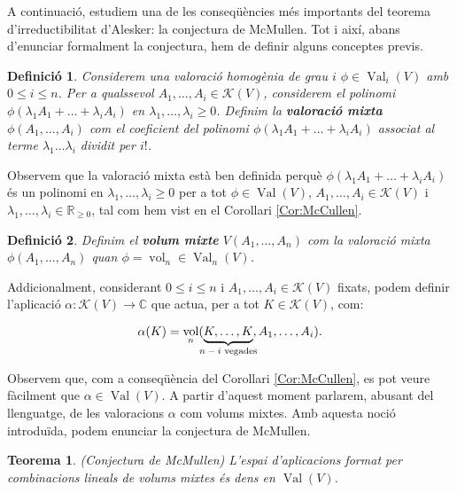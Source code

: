 \documentclass{article}
\newtheorem{teorema}{Teorema}
\newtheorem{definicio}{Definici\'{o}}
\theoremstyle{definition}
\DeclareMathOperator{\Val}{Val}
\DeclareMathOperator{\vol}{vol}
\begin{document}
A continuaci\'{o}, estudiem una de les conseq\"{u}\`{e}ncies m\'{e}s importants del teorema d'irreductibilitat d'Alesker: la conjectura de McMullen. Tot i aix\'{i}, abans d'enunciar formalment la conjectura, hem de definir alguns conceptes previs. 

\begin{definicio} \label{def:mixed}
Considerem una valoraci\'{o} homog\`{e}nia de grau $i$ $\phi \in \Val_i(V)$ amb $0 \leq i \leq n$. Per a qualssevol $A_1, \dots, A_i \in \mathcal{K}(V)$, considerem el polinomi $\phi(\lambda_1 A_1 + \dots + \lambda_i A_i)$ en $\lambda_1, \dots, \lambda_i \geq 0$. Definim la \textbf{valoraci\'{o} mixta} $\phi(A_1, \dots, A_i)$ com el coeficient del polinomi $\phi(\lambda_1 A_1 + \dots + \lambda_i A_i)$ associat al terme $\lambda_1 \dots \lambda_i$ dividit per $i!$.
\end{definicio}

Observem que la valoraci\'{o} mixta est\`{a} ben definida perqu\`{e} $\phi(\lambda_1 A_1 + \dots + \lambda_i A_i)$ \'{e}s un polinomi en $\lambda_1, \dots, \lambda_i \geq 0$ per a tot $\phi \in \Val(V)$, $A_1, \dots, A_i \in \mathcal{K}(V)$ i $\lambda_1, \dots, \lambda_i \in \mathbb{R}_{\geq 0}$, tal com hem vist en el Corol\textperiodcentered lari \ref{Cor:McCullen}.

\begin{definicio} \label{def:volmixt}
Definim el \textbf{volum mixte} $V(A_1, \dots, A_n)$ com la valoraci\'{o} mixta $\phi(A_1, \dots, A_n)$ quan $\phi = \vol_n \in \Val_n(V)$.
\end{definicio}

Addicionalment, considerant $0 \leq i \leq n$ i $A_1, \dots, A_i \in \mathcal{K}(V)$ fixats, podem definir l'aplicaci\'{o} $\alpha: \mathcal{K}(V) \longrightarrow \mathbb{C}$ que actua, per a tot $K \in \mathcal{K}(V)$, com:

\[ \alpha (K) = \vol_n(\underbrace{K, \dots, K}_{\mathclap{\text{$n-i$ vegades}}}, A_1, \dots, A_i). \]

Observem que, com a conseq\"{u}\`{e}ncia del Corol\textperiodcentered lari \ref{Cor:McCullen}, es pot veure f\`{a}cilment que $\alpha \in \Val(V)$. A partir d'aquest moment parlarem, abusant del llenguatge, de les valoracions $\alpha$ com volums mixtes.  Amb aquesta noci\'{o} introdu\"{i}da, podem enunciar la conjectura de McMullen.

\begin{teorema}
(Conjectura de McMullen) L'espai d'aplicacions format per combinacions lineals de volums mixtes \'{e}s dens en $\Val(V)$.
\end{teorema}
\end{document}
